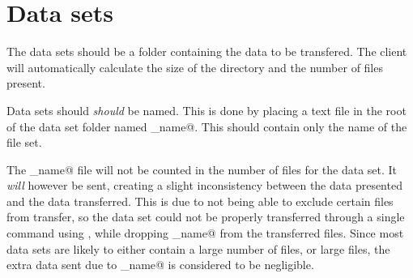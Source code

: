 \section{Data sets}
The data sets should be a folder containing the data to be transfered. The
client will automatically calculate the size of the directory and the number of
files present. 

Data sets should \textit{should} be named. This is done by placing a text file
in the root of the data set folder named \verb@fs_name@. This should contain
only the name of the file set.

The \verb@fs_name@ file will not be counted in the number of files for the data
set. It \textit{will} however be sent, creating a slight inconsistency between
the data presented and the data transferred. This is due to \verb@scp@ not
being able to exclude certain files from transfer, so the data set could not be
properly transferred through a single command using \verb@scp@, while dropping
\verb@fs_name@ from the transferred files. Since most data sets are likely to
either contain a large number of files, or large files, the extra data sent
due to \verb@fs_name@ is considered to be negligible.
